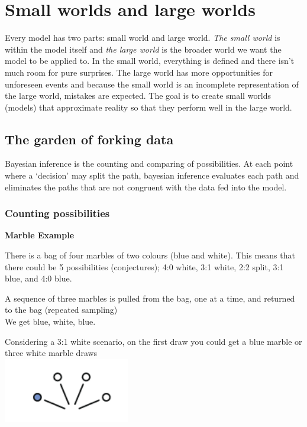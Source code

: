 \documentclass[
]{book}
\theoremstyle{definition}
\theoremstyle{definition}
\theoremstyle{definition}
\theoremstyle{definition}
\theoremstyle{remark}
\begin{document}
\hypertarget{small-worlds-and-large-worlds}{%
\chapter{Small worlds and large worlds}\label{small-worlds-and-large-worlds}}

Every model has two parts: small world and large world. \emph{The small world} is within the model itself and \emph{the large world} is the broader world we want the model to be applied to. In the small world, everything is defined and there isn't much room for pure surprises. The large world has more opportunities for unforeseen events and because the small world is an incomplete representation of the large world, mistakes are expected. The goal is to create small worlds (models) that approximate reality so that they perform well in the large world.

\hypertarget{the-garden-of-forking-data}{%
\section{The garden of forking data}\label{the-garden-of-forking-data}}

Bayesian inference is the counting and comparing of possibilities. At each point where a `decision' may split the path, bayesian inference evaluates each path and eliminates the paths that are not congruent with the data fed into the model.

\hypertarget{counting-possibilities}{%
\subsection{Counting possibilities}\label{counting-possibilities}}

\textbf{Marble Example}

There is a bag of four marbles of two colours (blue and white). This means that there could be 5 possibilities (conjectures); 4:0 white, 3:1 white, 2:2 split, 3:1 blue, and 4:0 blue.

A sequence of three marbles is pulled from the bag, one at a time, and returned to the bag (repeated sampling)\\
We get blue, white, blue.

Considering a 3:1 white scenario, on the first draw you could get a blue marble or three white marble draws\\

\includegraphics[width=2.17in]{./_images/fig2.1}
\end{document}
